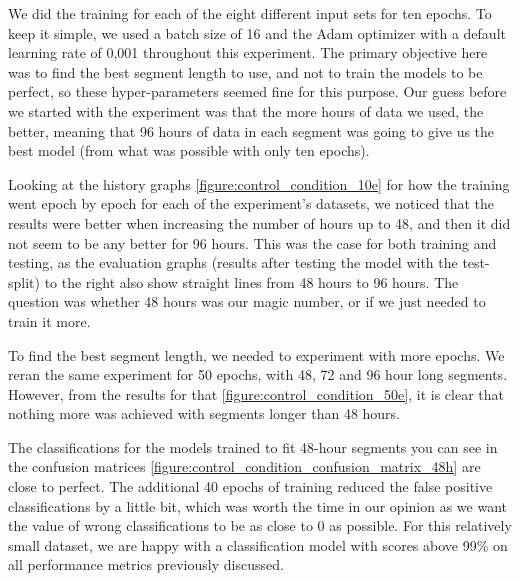 We did the training for each of the eight different input sets for ten epochs. To keep it simple, we used a batch size of 16 and the Adam optimizer with a default learning rate of 0,001 throughout this experiment. The primary objective here was to find the best segment length to use, and not to train the models to be perfect,  so these hyper-parameters seemed fine for this purpose. Our guess before we started with the experiment was that the more hours of data we used, the better, meaning that 96 hours of data in each segment was going to give us the best model (from what was possible with only ten epochs).

Looking at the history graphs \ref{figure:control_condition_10e} for how the training went epoch by epoch for each of the experiment's datasets, we noticed that the results were better when increasing the number of hours up to 48, and then it did not seem to be any better for 96 hours. This was the case for both training and testing, as the evaluation graphs (results after testing the model with the test-split) to the right also show straight lines from 48 hours to 96 hours. The question was whether 48 hours was our magic number, or if we just needed to train it more.

To find the best segment length, we needed to experiment with more epochs. We reran the same experiment for 50 epochs, with 48, 72 and 96 hour long segments. However, from the results for that \ref{figure:control_condition_50e}, it is clear that nothing more was achieved with segments longer than 48 hours. 

The classifications for the models trained to fit 48-hour segments you can see in the confusion matrices \ref{figure:control_condition_confusion_matrix_48h} are close to perfect. The additional 40 epochs of training reduced the false positive classifications by a little bit, which was worth the time in our opinion as we want the value of wrong classifications to be as close to 0 as possible. For this relatively small dataset, we are happy with a classification model with scores above 99\% on all performance metrics previously discussed. 

